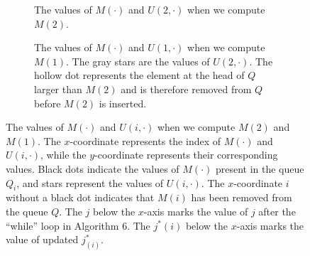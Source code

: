 \begin{figure}
    \centering
    \begin{subfigure}[t]{.45\textwidth}
        
        \caption{The values of $M(\cdot)$ and $U(2, \cdot)$ when we compute $M(2)$.}
        \label{fig:compute_M(2)}
    \end{subfigure}
    \begin{subfigure}[t]{.45\textwidth}
         
        \caption{The values of $M(\cdot)$ and $U(1, \cdot)$ when we compute $M(1)$.
        The gray stars are the values of $U(2,\cdot)$.
        The hollow dot represents the element at the head of $Q$ larger than $M(2)$ and is therefore removed from $Q$ before $M(2)$ is inserted.}
        \label{fig:compute_M(1)}
    \end{subfigure}
    \caption{The values of $M(\cdot)$ and $U(i, \cdot)$ when we compute $M(2)$ and $M(1)$.
    The $x$-coordinate represents the index of $M(\cdot)$ and $U(i, \cdot)$, while the $y$-coordinate represents their corresponding values.
    Black dots indicate the values of $M(\cdot)$ present in the queue $Q_i$, and stars represent the values of $U(i, \cdot)$.
    The $x$-coordinate $i$ without a black dot indicates that $M(i)$ has been removed from the queue $Q$.
    The $j$ below the $x$-axis marks the value of $j$ after the ``while'' loop in Algorithm 6.
    The $j^*(i)$ below the $x$-axis marks the value of updated $j^*_(i)$.
    }
\label{fig:computation_Demo}
\end{figure}